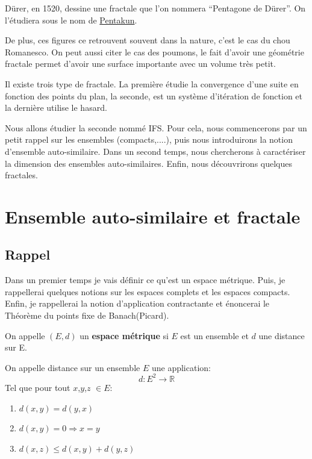 \documentclass[a4paper, 12pt]{report}
\begin{document}
		\hspace{.7 cm} Dürer, en 1520, dessine une fractale que l'on nommera ``Pentagone de Dürer''. On l'étudiera sous le nom de \hyperref[Pentakun]{Pentakun}. 
		
		
		\hspace{.7 cm} De plus,  ces figures ce retrouvent souvent dans la nature,  c'est le cas du chou Romanesco. On peut aussi citer le cas des poumons, le fait d'avoir une géométrie fractale permet d'avoir une surface importante avec un volume très petit.
		
		\hspace{.7 cm} Il existe trois type de fractale. La première étudie la convergence d'une suite en fonction des points du plan, la seconde, est un système d'itération de fonction et la dernière utilise le hasard.
		
		\hspace{.7 cm}Nous allons étudier la seconde nommé IFS. Pour cela, nous commencerons par un petit rappel sur les ensembles (compacts,....), puis nous introduirons la notion d'ensemble auto-similaire. Dans un second temps, nous chercherons à caractériser la dimension des ensembles auto-similaires. Enfin, nous découvrirons quelques fractales.	
	
	\chapter{\bf Ensemble auto-similaire et fractale}
		\section{Rappel}
			Dans un premier temps je vais définir ce qu'est un espace métrique. Puis, je rappellerai quelques notions sur les espaces complets et les espaces compacts. Enfin, je rappellerai la notion d'application contractante et énoncerai le Théorème du points fixe de Banach(Picard).
			
			\begin{definition}
				On appelle $(E,d)$ un \textbf{espace métrique} si $E$ est un ensemble et $d$ une distance sur E.
				
				On appelle distance sur un ensemble $E$ une application:
				\begin{equation*}
					d:E^2\longrightarrow \mathds{R}
				\end{equation*}
			Tel que pour tout $x$,$y$,$z$ $\in E$:
				\begin{enumerate}\itemsep2pt
					\item $d(x,y)=d(y,x)$
					\item $d(x,y)=0 \Longrightarrow x=y$
					\item $d(x,z) \leq d(x,y)+d(y,z)$
				\end{enumerate}
			\end{definition}
			
\end{document}
